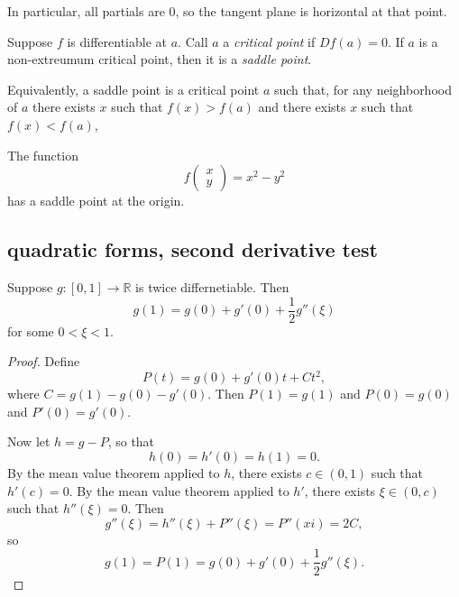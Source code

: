 \documentclass[12pt]{article}
\begin{document}
\begin{remark}
	In particular, all partials are $0$, so the tangent plane is horizontal at that point.
\end{remark}

\begin{definition}
	Suppose $f$ is differentiable at $a$. Call $a$ a \emph{critical point} if $Df(a)=0$. If $a$ is a non-extreumum critical point, then it is a \emph{saddle point}. 

	Equivalently, a saddle point is a critical point $a$ such that, for any neighborhood of $a$ there exists $x$ such that $f(x)>f(a)$ and there exists $x$ such that $f(x)<f(a)$, 
\end{definition}

\begin{example}
	The function 
	\begin{equation*}
		f\begin{pmatrix}x \\ y\end{pmatrix} = x^2-y^2
	\end{equation*}
	has a saddle point at the origin.
\end{example}

\subsection{quadratic forms, second derivative test} %

\begin{lemma}
	Suppose $g:[0,1]\to \mathbb{R}$ is twice differnetiable. Then 
	\begin{equation*}
		g(1)=g(0)+g'(0)+\frac{1}{2}g''(\xi)
	\end{equation*}
	for some $0<\xi<1$.
\end{lemma}
\begin{proof} 
	Define 
	\begin{equation*}
		P(t) = g(0)+g'(0)t+Ct^2,
	\end{equation*}
	where $C=g(1)-g(0)-g'(0)$. Then $P(1)=g(1)$ and $P(0)=g(0)$ and $P'(0)=g'(0)$.

	Now let $h=g-P$, so that 
	\begin{equation*}
		h(0)=h'(0)=h(1)=0.
	\end{equation*}
	By the mean value theorem applied to $h$, there exists $c\in (0,1)$ such that $h'(c)=0$. By the mean value theorem applied to $h'$, there exists $\xi\in (0,c)$ such that $h''(\xi)=0$. Then 
	\begin{equation*}
		g''(\xi)=h''(\xi)+P''(\xi)=P''(xi)=2C,
	\end{equation*}
	so 
	\begin{equation*}
		g(1)=P(1)=g(0)+g'(0)+\frac{1}{2}g''(\xi).
	\end{equation*}
\end{proof}	
\end{document}
